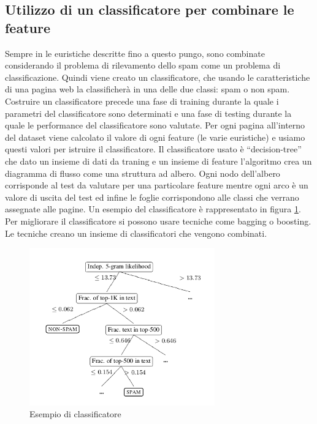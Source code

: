 \subsection{Utilizzo di un classificatore per combinare le feature}
Sempre in \cite{Ntoulas:2006:DSW:1135777.1135794} le euristiche descritte fino a questo pungo, sono combinate considerando il problema di rilevamento dello spam come un problema di classificazione. Quindi  viene creato un classificatore, che usando le caratteristiche di una  pagina web la classificherà in una delle due classi: spam o non spam. Costruire un classificatore precede una fase di training durante la quale i parametri del classificatore sono determinati e una fase di testing durante la quale le performance del classificatore sono valutate. Per ogni pagina all'interno del dataset viene calcolato il valore di ogni feature (le varie euristiche) e usiamo questi valori per istruire il classificatore. Il classificatore usato è ``decision-tree'' che dato un insieme di dati da traning e un insieme di feature l'algoritmo crea un diagramma di flusso come una struttura ad albero. Ogni nodo dell'albero corrisponde al test da valutare per una particolare feature mentre ogni arco è un valore di uscita del test 
ed 
infine le foglie corrispondono alle classi che verrano assegnate alle pagine. Un esempio del classificatore è rappresentato in figura \ref{fig:fetterly13}. Per migliorare il classificatore si possono usare tecniche come bagging o boosting. Le tecniche creano un insieme di classificatori  che vengono combinati.
\begin{figure}[htbp]
\centering
\includegraphics[width=8cm]{immagini/fetterly/fetterly13}
\caption{Esempio di classificatore}
\label{fig:fetterly13}
\end{figure}

